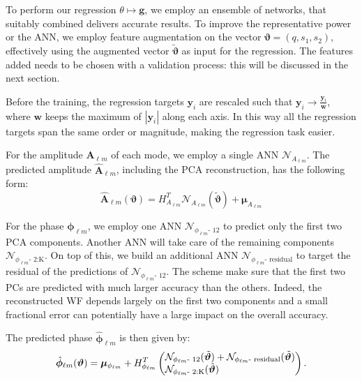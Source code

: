 \documentclass[twocolumn,showpacs,preprintnumbers,nofootinbib,prd,
superscriptaddress,10pt]{revtex4-1}
\begin{document}
To perform our regression $\theta \longmapsto \boldsymbol{g}$, we employ an ensemble of networks, that suitably combined delivers accurate results.
To improve the representative power or the ANN, we employ feature augmentation on the vector $\boldsymbol{\vartheta} = (q, s_1, s_2)$, effectively using the augmented vector $\tilde{\boldsymbol{\vartheta}}$ as input for the regression. The features added needs to be chosen with a validation process: this will be discussed in the next section.

Before the training, the regression targets $\boldsymbol{y}_i$ are rescaled such that $\boldsymbol{y}_i \rightarrow \frac{\boldsymbol{y}_i}{\boldsymbol{w}}$, where $\boldsymbol{w}$ keeps the maximum of $|\boldsymbol{y}_i|$ along each axis. %
In this way all the regression targets span the same order or magnitude, making the regression task easier.

For the amplitude $\boldsymbol{A}_{\ell m}$ of each mode, we employ a single ANN $\mathcal{N}_{A_{\ell m}}$.
The predicted amplitude $\hat{\boldsymbol{A}}_{\ell m}$, including the PCA reconstruction, has the following form:
\begin{equation}
	\hat{\boldsymbol{A}}_{\ell m}(\boldsymbol{\vartheta}) = H_{A_{\ell m}}^T \mathcal{N}_{A_{\ell m}}(\tilde{\boldsymbol{\vartheta}}) + \boldsymbol{\mu}_{A_{\ell m}}
\end{equation}

For the phase $\boldsymbol{\phi}_{\ell m}$, we employ one ANN $\mathcal{N}_{\phi_{\ell m}\text{- 12}}$ to predict only the first two PCA components.
Another ANN will take care of the remaining components $\mathcal{N}_{\phi_{\ell m}\text{- 2:K}}$.
On top of this, we build an additional ANN $\mathcal{N}_{\phi_{\ell m}\text{- residual}}$ to target the residual of the predictions of $\mathcal{N}_{\phi_{\ell m}\text{- 12}}$.
The scheme make sure that the first two PCs are predicted with much larger accuracy than the others. Indeed, the reconstructed WF depends largely on the first two components and a small fractional error can potentially have a large impact on the overall accuracy.

The predicted phase $\hat{\boldsymbol{\phi}}_{\ell m}$ is then given by:
%
\begin{equation}
	\hat{\boldsymbol{\phi}}_{\ell m}(\boldsymbol{\vartheta}) = \boldsymbol{\mu}_{\phi_{\ell m}} + H_{\phi_{\ell m}}^T 
	\begin{pmatrix}
        \mathcal{N}_{\phi_{\ell m}\text{- 12}}(\tilde{\boldsymbol{\vartheta}}) + \mathcal{N}_{\phi_{\ell m}\text{- residual}}(\tilde{\boldsymbol{\vartheta}}) \\
        \mathcal{N}_{\phi_{\ell m}\text{- 2:K}}(\tilde{\boldsymbol{\vartheta}}) \hfill
	 \end{pmatrix}.
\end{equation}
\end{document}
